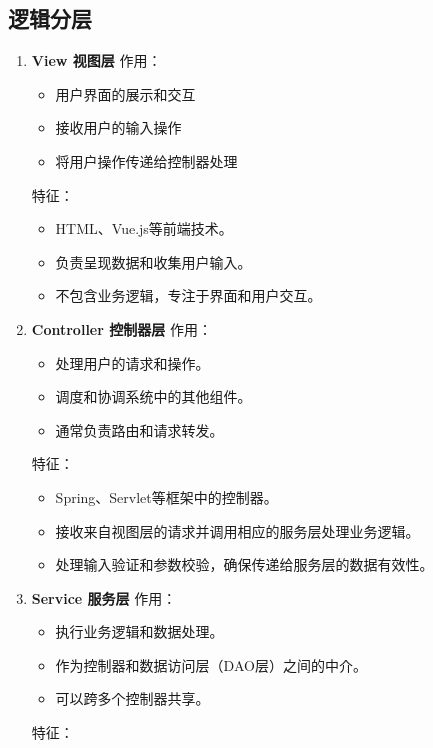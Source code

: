 \documentclass{article}
\begin{document}
\subsection{逻辑分层}
\begin{enumerate}
    \item \textbf{View 视图层} \newline
    作用：
        \begin{itemize}
        \item 用户界面的展示和交互
        \item 接收用户的输入操作
        \item 将用户操作传递给控制器处理
        \end{itemize}
    特征：
        \begin{itemize}
        \item HTML、Vue.js等前端技术。
        \item 负责呈现数据和收集用户输入。
        \item 不包含业务逻辑，专注于界面和用户交互。
        \end{itemize}
    \item \textbf{Controller 控制器层} \newline
    作用：
        \begin{itemize}
        \item 处理用户的请求和操作。
        \item 调度和协调系统中的其他组件。
        \item 通常负责路由和请求转发。
        \end{itemize}
    特征：
        \begin{itemize}
        \item Spring、Servlet等框架中的控制器。
        \item 接收来自视图层的请求并调用相应的服务层处理业务逻辑。
        \item 处理输入验证和参数校验，确保传递给服务层的数据有效性。
        \end{itemize}
    \item \textbf{Service 服务层} \newline
    作用：
        \begin{itemize}
        \item 执行业务逻辑和数据处理。
        \item 作为控制器和数据访问层（DAO层）之间的中介。
        \item 可以跨多个控制器共享。
        \end{itemize}
    特征：
        \begin{itemize}

\end{itemize}
\end{enumerate}
\end{document}

